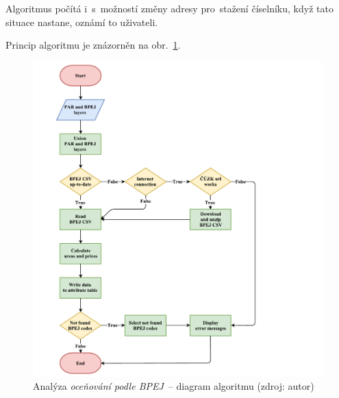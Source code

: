 Algoritmus počítá i~s~možností změny adresy pro~stažení číselníku,
když tato situace nastane, oznámí to uživateli.

Princip algoritmu je znázorněn na obr.~\ref{fig:diagram_bpej}.

	\begin{figure}[H] %
		\includegraphics[width=1.2\textwidth]{./pictures/bpej.pdf}
		\caption[Analýza \textit{oceňování podle BPEJ}~–
diagram algoritmu]{Analýza \textit{oceňování podle BPEJ}~– diagram
algoritmu (zdroj: autor)}
		\label{fig:diagram_bpej}
 	\end{figure}
